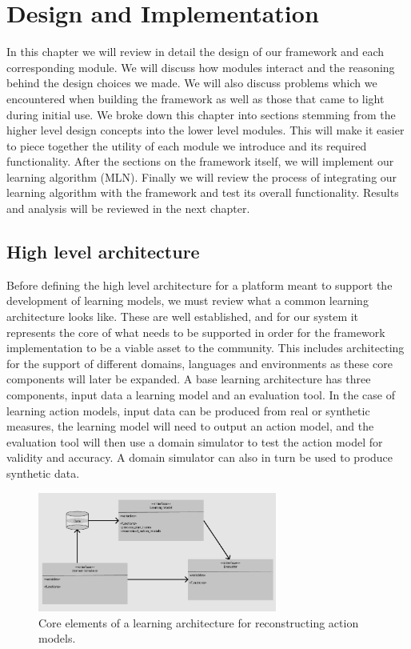 \chapter{Design and Implementation}
In this chapter we will review in detail the design of our framework and each corresponding module.
We will discuss how modules interact and the reasoning behind the design choices we made.
We will also discuss problems which we encountered when building the framework as well as those that came to light during initial use.
We broke down this chapter into sections stemming from the higher level design concepts into the lower level modules.
This will make it easier to piece together the utility of each module we introduce and its required functionality.
After the sections on the framework itself, we will implement our learning algorithm (MLN).
Finally we will review the process of integrating our learning algorithm with the framework and test its overall functionality.
Results and analysis will be reviewed in the next chapter.
\section{High level architecture}
Before defining the high level architecture for a platform meant to support the development of learning models, we must review what a common learning architecture looks like.
These are well established, and for our system it represents the core of what needs to be supported in order for the framework implementation to be a viable asset to the community.
This includes architecting for the support of different domains, languages and environments as these core components will later be expanded.
A base learning architecture has three components, input data a learning model and an evaluation tool.
In the case of learning action models, input data can be produced from real or synthetic measures, the learning model will need to output an action model, and the evaluation tool will then use a domain simulator to test the action model for validity and accuracy.
A domain simulator can also in turn be used to produce synthetic data.

\begin{figure}[h]
 \centering

 \includegraphics[width=0.7\textwidth]{images/architecture/Core Architecture}
 \caption{Core elements of a learning architecture for reconstructing action models.}

\end{figure}
\newpage
